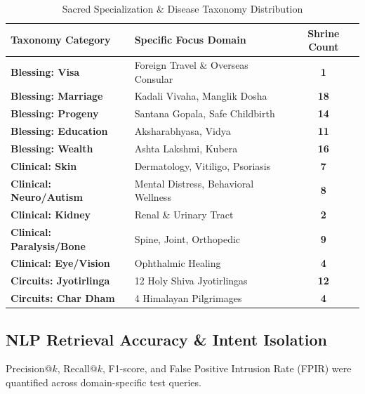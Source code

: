 \documentclass[lettersize,journal]{IEEEtran}
\begin{document}
\begin{table}[htbp]
\caption{Sacred Specialization \& Disease Taxonomy Distribution}
\centering
\begin{tabular}{llc}
\toprule
\textbf{Taxonomy Category} & \textbf{Specific Focus Domain} & \textbf{Shrine Count} \\
\midrule
\textbf{Blessing: Visa} & Foreign Travel \& Overseas Consular & \textbf{1} \\
\textbf{Blessing: Marriage} & Kadali Vivaha, Manglik Dosha & \textbf{18} \\
\textbf{Blessing: Progeny} & Santana Gopala, Safe Childbirth & \textbf{14} \\
\textbf{Blessing: Education} & Aksharabhyasa, Vidya & \textbf{11} \\
\textbf{Blessing: Wealth} & Ashta Lakshmi, Kubera & \textbf{16} \\
\textbf{Clinical: Skin} & Dermatology, Vitiligo, Psoriasis & \textbf{7} \\
\textbf{Clinical: Neuro/Autism} & Mental Distress, Behavioral Wellness & \textbf{8} \\
\textbf{Clinical: Kidney} & Renal \& Urinary Tract & \textbf{2} \\
\textbf{Clinical: Paralysis/Bone} & Spine, Joint, Orthopedic & \textbf{9} \\
\textbf{Clinical: Eye/Vision} & Ophthalmic Healing & \textbf{4} \\
\textbf{Circuits: Jyotirlinga} & 12 Holy Shiva Jyotirlingas & \textbf{12} \\
\textbf{Circuits: Char Dham} & 4 Himalayan Pilgrimages & \textbf{4} \\
\bottomrule
\end{tabular}
\end{table}

\subsection{NLP Retrieval Accuracy \& Intent Isolation}
Precision@$k$, Recall@$k$, F1-score, and False Positive Intrusion Rate (FPIR) were quantified across domain-specific test queries.
\end{document}
